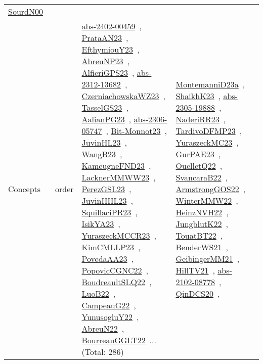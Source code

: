 {\begin{longtable}{lp{3cm}>{\raggedright\arraybackslash}p{6cm}>{\raggedright\arraybackslash}p{6cm}>{\raggedright\arraybackslash}p{8cm}}
\href{works/SourdN00.pdf}{SourdN00}~\cite{SourdN00}\\
Concepts & order & \href{works/abs-2402-00459.pdf}{abs-2402-00459}~\cite{abs-2402-00459}, \href{works/PrataAN23.pdf}{PrataAN23}~\cite{PrataAN23}, \href{works/EfthymiouY23.pdf}{EfthymiouY23}~\cite{EfthymiouY23}, \href{works/AbreuNP23.pdf}{AbreuNP23}~\cite{AbreuNP23}, \href{works/AlfieriGPS23.pdf}{AlfieriGPS23}~\cite{AlfieriGPS23}, \href{works/abs-2312-13682.pdf}{abs-2312-13682}~\cite{abs-2312-13682}, \href{works/CzerniachowskaWZ23.pdf}{CzerniachowskaWZ23}~\cite{CzerniachowskaWZ23}, \href{works/TasselGS23.pdf}{TasselGS23}~\cite{TasselGS23}, \href{works/AalianPG23.pdf}{AalianPG23}~\cite{AalianPG23}, \href{works/abs-2306-05747.pdf}{abs-2306-05747}~\cite{abs-2306-05747}, \href{works/Bit-Monnot23.pdf}{Bit-Monnot23}~\cite{Bit-Monnot23}, \href{works/JuvinHL23.pdf}{JuvinHL23}~\cite{JuvinHL23}, \href{works/WangB23.pdf}{WangB23}~\cite{WangB23}, \href{works/KameugneFND23.pdf}{KameugneFND23}~\cite{KameugneFND23}, \href{works/LacknerMMWW23.pdf}{LacknerMMWW23}~\cite{LacknerMMWW23}, \href{works/PerezGSL23.pdf}{PerezGSL23}~\cite{PerezGSL23}, \href{works/JuvinHHL23.pdf}{JuvinHHL23}~\cite{JuvinHHL23}, \href{works/SquillaciPR23.pdf}{SquillaciPR23}~\cite{SquillaciPR23}, \href{works/IsikYA23.pdf}{IsikYA23}~\cite{IsikYA23}, \href{works/YuraszeckMCCR23.pdf}{YuraszeckMCCR23}~\cite{YuraszeckMCCR23}, \href{works/KimCMLLP23.pdf}{KimCMLLP23}~\cite{KimCMLLP23}, \href{works/PovedaAA23.pdf}{PovedaAA23}~\cite{PovedaAA23}, \href{works/PopovicCGNC22.pdf}{PopovicCGNC22}~\cite{PopovicCGNC22}, \href{works/BoudreaultSLQ22.pdf}{BoudreaultSLQ22}~\cite{BoudreaultSLQ22}, \href{works/LuoB22.pdf}{LuoB22}~\cite{LuoB22}, \href{works/CampeauG22.pdf}{CampeauG22}~\cite{CampeauG22}, \href{works/YunusogluY22.pdf}{YunusogluY22}~\cite{YunusogluY22}, \href{works/AbreuN22.pdf}{AbreuN22}~\cite{AbreuN22}, \href{works/BourreauGGLT22.pdf}{BourreauGGLT22}~\cite{BourreauGGLT22}... (Total: 286) & \href{works/MontemanniD23a.pdf}{MontemanniD23a}~\cite{MontemanniD23a}, \href{works/ShaikhK23.pdf}{ShaikhK23}~\cite{ShaikhK23}, \href{works/abs-2305-19888.pdf}{abs-2305-19888}~\cite{abs-2305-19888}, \href{works/NaderiRR23.pdf}{NaderiRR23}~\cite{NaderiRR23}, \href{works/TardivoDFMP23.pdf}{TardivoDFMP23}~\cite{TardivoDFMP23}, \href{works/YuraszeckMC23.pdf}{YuraszeckMC23}~\cite{YuraszeckMC23}, \href{works/GurPAE23.pdf}{GurPAE23}~\cite{GurPAE23}, \href{works/OuelletQ22.pdf}{OuelletQ22}~\cite{OuelletQ22}, \href{works/SvancaraB22.pdf}{SvancaraB22}~\cite{SvancaraB22}, \href{works/ArmstrongGOS22.pdf}{ArmstrongGOS22}~\cite{ArmstrongGOS22}, \href{works/WinterMMW22.pdf}{WinterMMW22}~\cite{WinterMMW22}, \href{works/HeinzNVH22.pdf}{HeinzNVH22}~\cite{HeinzNVH22}, \href{works/JungblutK22.pdf}{JungblutK22}~\cite{JungblutK22}, \href{works/TouatBT22.pdf}{TouatBT22}~\cite{TouatBT22}, \href{works/BenderWS21.pdf}{BenderWS21}~\cite{BenderWS21}, \href{works/GeibingerMM21.pdf}{GeibingerMM21}~\cite{GeibingerMM21}, \href{works/HillTV21.pdf}{HillTV21}~\cite{HillTV21}, \href{works/abs-2102-08778.pdf}{abs-2102-08778}~\cite{abs-2102-08778}, \href{works/QinDCS20.pdf}{QinDCS20}~\cite{QinDCS20}, 
\end{longtable}}
